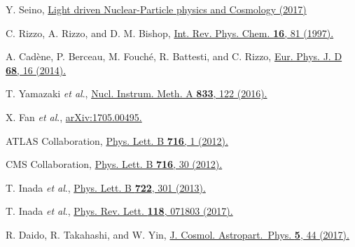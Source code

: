 \documentclass[10pt,a4paper]{article}%
\begin{document}
\begin{thebibliography}{999}
Y. Seino,
\href{http://tabletop.icepp.s.u-tokyo.ac.jp/Tabletop_experiments/English_Home_files/seino-lnpc17.pdf}
{Light driven Nuclear-Particle physics and Cosmology (2017)}

C. Rizzo, A. Rizzo, and D. M. Bishop,
\href{https://doi.org/10.1080/014423597230316}
{Int. Rev. Phys. Chem. {\bf 16}, 81 (1997).}

A. Cad\`ene, P. Berceau, M. Fouch\'e, R. Battesti, and C. Rizzo,
\href{https://doi.org/10.1140/epjd/e2013-40725-9}
{Eur. Phys. J. D {\bf 68}, 16 (2014).}

T. Yamazaki {\it et al}.,
\href{http://doi.org/10.1016/j.nima.2016.07.031}
{Nucl. Instrum. Meth. A {\bf 833}, 122 (2016).}

X. Fan {\it et al}.,
\href{https://arxiv.org/abs/1705.00495}
{arXiv:1705.00495.}

ATLAS Collaboration,
\href{http://doi.org/10.1016/j.physletb.2012.08.020}
{Phys. Lett. B {\bf 716}, 1 (2012).}

CMS Collaboration,
\href{http://doi.org/10.1016/j.physletb.2012.08.021}
{Phys. Lett. B {\bf 716}, 30 (2012).}

T. Inada {\it et al}.,
\href{http://dx.doi.org/10.1016/j.physletb.2013.04.033}
{Phys. Lett. B {\bf 722}, 301 (2013).}

T. Inada {\it et al}.,
\href{https://doi.org/10.1103/PhysRevLett.118.071803}
{Phys. Rev. Lett. {\bf 118}, 071803 (2017).}

R. Daido, R. Takahashi, and W. Yin,
\href{https://doi.org/10.1088/1475-7516/2017/05/044}
{J. Cosmol. Astropart.~Phys. {\bf 5}, 44 (2017).}


\end{thebibliography}
\end{document}
